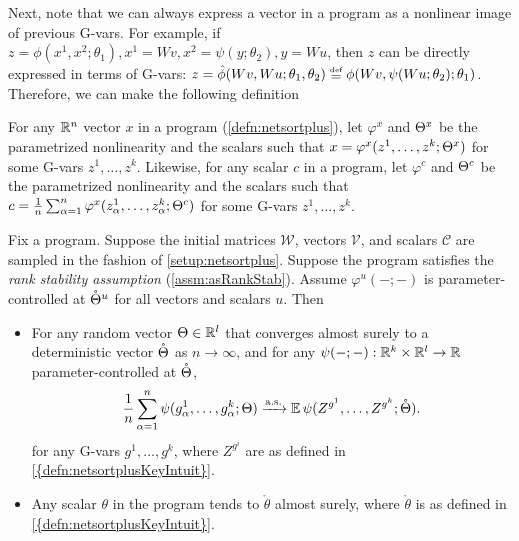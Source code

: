 \documentclass[main.tex]{subfiles}
\begin{document}
Next, note that we can always express a vector in a \netsortplus{} program as a nonlinear image of previous G-vars.
For example, if $z = \phi(x^1, x^2; \theta_1), x^1 = W v, x^2 = \psi(y; \theta_2), y = W u$, then $z$ can be directly expressed in terms of G-vars: $z = \hat \phi(W v, W u; \theta_1, \theta_2) \defeq \phi(Wv, \psi(W u; \theta_2); \theta_1)$.
Therefore, we can make the following definition
\begin{defn} For any $\mathbb{R}^n$ vector $x$ in a \netsortplus{} program (\cref{defn:netsortplus}), let $\varphi^{x}$ and $\Theta^{x}$ be the parametrized nonlinearity and the scalars such that $x=\varphi^{x}(z^{1},\ldots,z^{k};\Theta^{x})$ for some G-vars $z^{1},\ldots,z^{k}$. Likewise, for any scalar $c$ in a \netsortplus{} program, let $\varphi^{c}$ and $\Theta^{c}$ be the parametrized nonlinearity and the scalars such that $c=\frac{1}{n}\sum_{\alpha=1}^{n}\varphi^{x}(z_{\alpha}^{1},\ldots,z_{\alpha}^{k};\Theta^{c})$ for some G-vars $z^{1},\ldots,z^{k}$. \end{defn}

\begin{thm}
    \label{thm:PCNetsorT+MasterTheorem} Fix a \netsort{} program. Suppose the initial matrices $\mathcal{W}$, vectors $\mathcal{V}$, and scalars $\mathcal{C}$ are sampled in the fashion of \cref{setup:netsortplus}.
    Suppose the program satisfies the \emph{rank stability assumption} (\cref{assm:asRankStab}).
    Assume $\varphi^u(-;-)$ is parameter-controlled at $\mathring {\Theta}^u$ for all vectors and scalars $u$.
    Then 
    \begin{itemize}
        \item 
        For any random vector $\Theta \in \mathbb{R}^l$ that converges almost surely to a deterministic vector $\mathring{\Theta}$ as $n \to \infty$, and for any $\psi(-; -): \mathbb{R}^k \times \mathbb{R}^l \to \mathbb{R}$ parameter-controlled at $\mathring{\Theta}$,
        \begin{align*}
            \frac{1}{n} \sum_{\alpha=1}^n \psi(g^1_\alpha, \ldots, g^k_\alpha; \Theta) \xrightarrow{\mathrm{a.s.}} \operatorname*{\mathbb{E}}\psi(Z^{g^1}, \ldots, Z^{g^k}; \mathring{\Theta}).
        \end{align*}
        for any G-vars $g^1, \ldots, g^k$, 
        where $Z^{g^{i}}$ are as defined in \cref{{defn:netsortplusKeyIntuit}}.
        \item Any scalar $\theta$ in the program tends to $\mathring{\theta}$ almost surely, where $\mathring{\theta}$ is as defined in \cref{{defn:netsortplusKeyIntuit}}.
    \end{itemize}
\end{thm}
\end{document}
